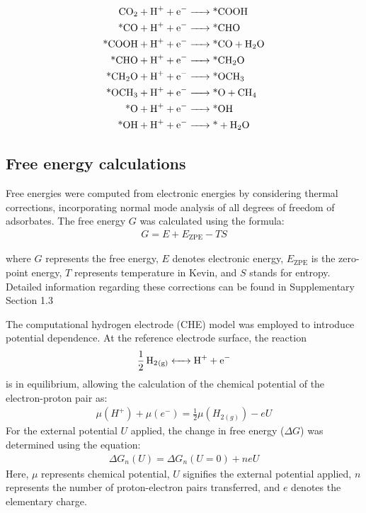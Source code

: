 \begin{align}
\ce{CO2 + H+ + e-          &-> \text{*}COOH}      \label{main_eq1:co2rr1}    \\
\ce{\text{*}CO + H+ + e-   &-> \text{*}CHO}       \label{main_eq3:co2rr3}    \\
\ce{\text{*}COOH + H+ + e- &-> \text{*}CO + H2O}  \label{main_eq2:co2rr2}    \\
\ce{\text{*}CHO + H+ + e-  &-> \text{*}CH2O}      \label{main_eq4:co2rr4}    \\
\ce{\text{*}CH2O + H+ + e- &-> \text{*}OCH3}      \label{main_eq5:co2rr5}    \\
\ce{\text{*}OCH3 + H+ + e- &-> \text{*}O + CH4}   \label{main_eq6:co2rr6}    \\
\ce{\text{*}O + H+ + e-    &-> \text{*}OH}        \label{main_eq7:co2rr7}    \\
\ce{\text{*}OH + H+ + e-   &-> \text{*} + H2O}    \label{main_eq8:co2rr8}
\end{align}


\subsection{Free energy calculations}
Free energies were computed from electronic energies by considering thermal corrections, incorporating normal mode analysis of all degrees of freedom of adsorbates.
The free energy $\textit{G}$ was calculated using the formula:
\begin{align}
G = E + E_{\text{ZPE}} - TS  \label{main_eq9:free_energy}
\end{align}

where $\textit{G}$ represents the free energy, $\textit{E}$ denotes electronic energy, $\textit{E}_{\text{ZPE}}$ is the zero-point energy, $\textit{T}$ represents temperature in Kevin, and $\textit{S}$ stands for entropy.
Detailed information regarding these corrections can be found in Supplementary Section 1.3 %

The computational hydrogen electrode (CHE) model \cite{peterson2010copper, norskov2004origin} was employed to introduce potential dependence.
At the reference electrode surface, the reaction
\begin{align}
\ce{1/2H2_{(g)}  <-> H+ + e-}  \label{main_eq10:che}
\end{align}
is in equilibrium, allowing the calculation of the chemical potential of the electron-proton pair as:
\begin{align}
\mu(H^+) + \mu(e^-) = \frac{1}{2}\mu(H_{2(g)}) - eU  \label{main_eq11:che_potential}
\end{align}
For the external potential $\textit{U}$ applied, the change in free energy ($\Delta \textit{G}$) was determined using the equation:
\begin{align}
\Delta G_n(U) = \Delta G_n(U=0) + neU  \label{main_eq12:ext_potential_che}
\end{align}
Here, $\mu$ represents chemical potential, $\textit{U}$ signifies the external potential applied, $\textit{n}$ represents the number of proton-electron pairs transferred, and $\textit{e}$ denotes the elementary charge.


